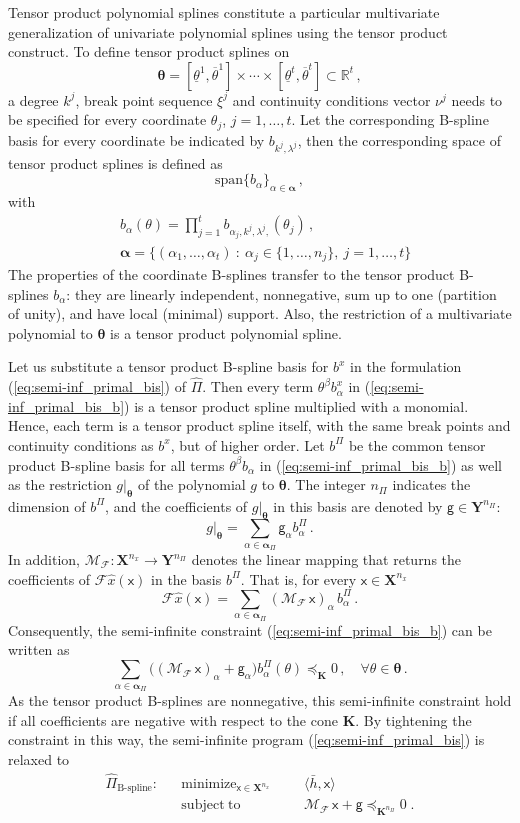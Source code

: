 \documentclass{article}
\DeclareMathOperator*{\minimize}{minimize}
\DeclareMathOperator*{\subj}{subject\;to}
\newcommand{\R}{\mathbb{R}}         %
\newcommand{\ppar}{\theta}                          %
\newcommand{\Ppar}{{\bm{\theta}}}                   %
\newcommand{\X}{\mathbf{X}}                         %
\newcommand{\Y}{\mathbf{Y}}                         %
\newcommand{\K}{\mathbf{K}}                         %
\newcommand{\calF}{\mathcal{F}}                     %
\newcommand{\bx}{b^x}               %
\newcommand{\bxa}{\bx_\alpha}       %
\newcommand{\cx}{\textsf{x}}        %
\newcommand{\nx}{{n_x}}             %
\newcommand{\Alpha}{\bm{\alpha}}    %
\newcommand{\meanh}{\bar{h}}        %
\newcommand{\pparL}{\underline{\ppar}}
\newcommand{\pparU}{\overline{\ppar}}
\newcommand{\bPi}{b^\Pi}                %
\newcommand{\bPia}{b^\Pi_\alpha}        %
\newcommand{\nPi}{{n_\Pi}}              %
\newcommand{\cg}{\textsf{g}}            %
\newcommand{\cga}{\textsf{g}_\alpha}    %
\newcommand{\calMF}{\mathcal{M}_{\mathcal{F}}}
\begin{document}
Tensor product polynomial splines constitute a particular multivariate  generalization of univariate polynomial splines using the tensor product construct. To define tensor product splines on
\[  \Ppar = [\pparL^1,\pparU^1] \times \cdots \times  [\pparL^t,\pparU^t] \subset\R^t \,,%
\]
a degree $k^j$, break point sequence $\xi^j$ and continuity conditions vector $\nu^j$ needs to be specified for every coordinate $\ppar_j$, $j=1,\ldots,t$. Let the corresponding B-spline basis for every coordinate be indicated by $b_{k^j,\lambda^j}$, then the corresponding space of tensor product splines is defined as
\[ \text{span} \{b_\alpha\}_{\alpha\in\Alpha} \,,
\]
with
\begin{align*}
& b_\alpha(\ppar) = \prod_{j=1}^t b_{\alpha_j, k^j, \lambda^j,}(\ppar_j) \,,\\%
& \Alpha = \big\{(\alpha_1, \ldots, \alpha_t) ~:~ \alpha_j\in\{1,\ldots,n_j\},~ j=1,\ldots,t \big\}%
\end{align*}
The properties of the coordinate B-splines transfer to the tensor product B-splines $b_\alpha$: they are linearly independent, nonnegative, sum up to one (partition of unity), and have local (minimal) support. Also, the restriction of a multivariate polynomial to $\Ppar$ is a tensor product polynomial spline.

Let us substitute a tensor product B-spline basis for $\bx$ in the formulation (\ref{eq:semi-inf_primal_bis}) of $\hat{\Pi}$. Then every term $\ppar^\beta \bxa$ in (\ref{eq:semi-inf_primal_bis_b}) is a tensor product spline multiplied with a monomial. Hence, each term is a tensor product spline itself, with the same break points and continuity conditions as $\bx$, but of higher order. Let $\bPi$ be the common tensor product B-spline basis for all terms $\ppar^\beta b_\alpha$ in (\ref{eq:semi-inf_primal_bis_b}) as well as the restriction $g|_\Ppar$ of the polynomial $g$ to $\Ppar$. The integer $\nPi$ indicates the dimension of $\bPi$, and the coefficients of $g|_\Ppar$ in this basis are denoted by $\cg\in\Y^\nPi$:
\[ g|_\Ppar = \sum_{\alpha\in\Alpha_\Pi} \cga \bPia\,.%
\]
In addition, $\calMF:\X^\nx \rightarrow \Y^\nPi$ denotes the linear mapping that returns the coefficients of $\calF\hat{x}(\cx)$ in the basis $\bPi$. That is, for every $\cx\in\X^\nx $
\[ \calF\hat{x}(\cx) = \sum_{\alpha\in\Alpha_\Pi} (\calMF \, \cx)_\alpha \, \bPia\,. %
\]
Consequently, the semi-infinite constraint (\ref{eq:semi-inf_primal_bis_b}) can be written as
\[ \sum_{\alpha\in\Alpha_\Pi} \big( (\calMF \, \cx)_\alpha + \cga \big) \bPia(\ppar) \preceq_\K 0\,,\quad\forall\ppar\in\Ppar\,.%
\]
As the tensor product B-splines are nonnegative, this semi-infinite constraint hold if all coefficients are negative with respect to the cone $\K$. By tightening the constraint in this way, the semi-infinite program (\ref{eq:semi-inf_primal_bis}) is relaxed to
\[\begin{aligned}
\hat{\Pi}_{\text{B-spline}}: && \minimize_{\cx\in\X^\nx} &&& \langle \meanh, \cx \rangle  \\%
                             && \subj                    &&& \calMF \, \cx + \cg \preceq_{\K^\nPi} 0 \;.%
\end{aligned}\]
\end{document}
